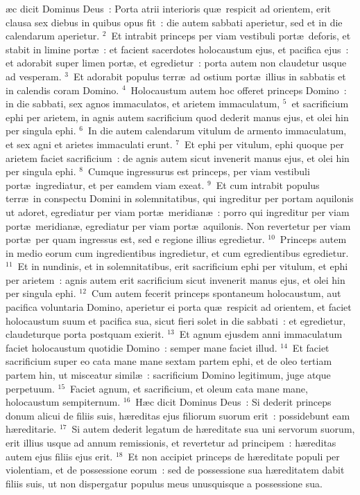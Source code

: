 \bchapter
{}\ae c dicit Dominus Deus~: Porta atrii interioris qu\ae\ respicit ad orientem, erit clausa sex diebus in quibus opus fit~: die autem sabbati aperietur, sed et in die calendarum aperietur.
${}^{2}$~Et intrabit princeps per viam vestibuli port\ae\ deforis, et stabit in limine port\ae~: et facient sacerdotes holocaustum ejus, et pacifica ejus~: et adorabit super limen port\ae , et egredietur~: porta autem non claudetur usque ad vesperam.
${}^{3}$~Et adorabit populus terr\ae\ ad ostium port\ae\ illius in sabbatis et in calendis coram Domino.
${}^{4}$~Holocaustum autem hoc offeret princeps Domino~: in die sabbati, sex agnos immaculatos, et arietem immaculatum,
${}^{5}$~et sacrificium ephi per arietem, in agnis autem sacrificium quod dederit manus ejus, et olei hin per singula ephi.
${}^{6}$~In die autem calendarum vitulum de armento immaculatum, et sex agni et arietes immaculati erunt.
${}^{7}$~Et ephi per vitulum, ephi quoque per arietem faciet sacrificium~: de agnis autem sicut invenerit manus ejus, et olei hin per singula ephi.
${}^{8}$~Cumque ingressurus est princeps, per viam vestibuli port\ae\ ingrediatur, et per eamdem viam exeat.
${}^{9}$~Et cum intrabit populus terr\ae\ in conspectu Domini in solemnitatibus, qui ingreditur per portam aquilonis ut adoret, egrediatur per viam port\ae\ meridian\ae~: porro qui ingreditur per viam port\ae\ meridian\ae , egrediatur per viam port\ae\ aquilonis. Non revertetur per viam port\ae\ per quam ingressus est, sed e regione illius egredietur.
${}^{10}$~Princeps autem in medio eorum cum ingredientibus ingredietur, et cum egredientibus egredietur.
${}^{11}$~Et in nundinis, et in solemnitatibus, erit sacrificium ephi per vitulum, et ephi per arietem~: agnis autem erit sacrificium sicut invenerit manus ejus, et olei hin per singula ephi.
${}^{12}$~Cum autem fecerit princeps spontaneum holocaustum, aut pacifica voluntaria Domino, aperietur ei porta qu\ae\ respicit ad orientem, et faciet holocaustum suum et pacifica sua, sicut fieri solet in die sabbati~: et egredietur, claudeturque porta postquam exierit.
${}^{13}$~Et agnum ejusdem anni immaculatum faciet holocaustum quotidie Domino~: semper mane faciet illud.
${}^{14}$~Et faciet sacrificium super eo cata mane mane sextam partem ephi, et de oleo tertiam partem hin, ut misceatur simil\ae~: sacrificium Domino legitimum, juge atque perpetuum.
${}^{15}$~Faciet agnum, et sacrificium, et oleum cata mane mane, holocaustum sempiternum.
${}^{16}$~H\ae c dicit Dominus Deus~: Si dederit princeps donum alicui de filiis suis, h\ae reditas ejus filiorum suorum erit~: possidebunt eam h\ae reditarie.
${}^{17}$~Si autem dederit legatum de h\ae reditate sua uni servorum suorum, erit illius usque ad annum remissionis, et revertetur ad principem~: h\ae reditas autem ejus filiis ejus erit.
${}^{18}$~Et non accipiet princeps de h\ae reditate populi per violentiam, et de possessione eorum~: sed de possessione sua h\ae reditatem dabit filiis suis, ut non dispergatur populus meus unusquisque a possessione sua.


